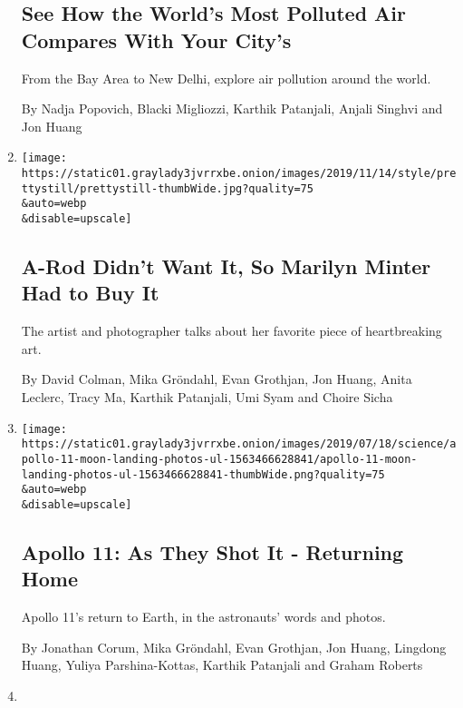 \begin{enumerate}
{  \subsection{See How the World's Most Polluted Air Compares With Your
  City's}\label{see-how-the-worlds-most-polluted-air-compares-with-your-citys}}

  From the Bay Area to New Delhi, explore air pollution around the
  world.

  By Nadja Popovich, Blacki Migliozzi, Karthik Patanjali, Anjali Singhvi
  and Jon Huang
\item
  \href{/interactive/2019/11/14/style/possessed-kara-walker.html}{}

  \texttt{[image: https://static01.graylady3jvrrxbe.onion/images/2019/11/14/style/prettystill/prettystill-thumbWide.jpg?quality=75\\\&auto=webp\\\&disable=upscale]}

  \hypertarget{a-rod-didnt-want-it-so-marilyn-minter-had-to-buy-it}{%
  \subsection{A-Rod Didn't Want It, So Marilyn Minter Had to Buy
  It}\label{a-rod-didnt-want-it-so-marilyn-minter-had-to-buy-it}}

  The artist and photographer talks about her favorite piece of
  heartbreaking art.

  By David Colman, Mika Gröndahl, Evan Grothjan, Jon Huang, Anita
  Leclerc, Tracy Ma, Karthik Patanjali, Umi Syam and Choire Sicha
\item
  \href{/interactive/2019/07/18/science/apollo-11-moon-earth-photos-ul.html}{}

  \texttt{[image: https://static01.graylady3jvrrxbe.onion/images/2019/07/18/science/apollo-11-moon-landing-photos-ul-1563466628841/apollo-11-moon-landing-photos-ul-1563466628841-thumbWide.png?quality=75\\\&auto=webp\\\&disable=upscale]}

  \hypertarget{apollo-11-as-they-shot-it---returning-home}{%
  \subsection{Apollo 11: As They Shot It - Returning
  Home}\label{apollo-11-as-they-shot-it---returning-home}}

  Apollo 11's return to Earth, in the astronauts' words and photos.

  By Jonathan Corum, Mika Gröndahl, Evan Grothjan, Jon Huang, Lingdong
  Huang, Yuliya Parshina-Kottas, Karthik Patanjali and Graham Roberts
\item
  \href{/interactive/2019/07/18/science/apollo-11-as-they-shot-it-ul.html}{}


\end{enumerate}
